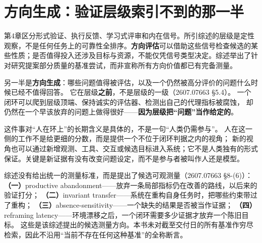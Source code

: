 \section{方向生成：验证层级索引不到的那一半}
\label{sec:ch16-direction}

\begin{sloppypar}
第4章区分形式验证、执行反馈、学习式评审和内在信号。所引综述的层级是定性观察，不是任何任务上的可靠性全排序。\textbf{方向评估}可以借助这些信号检查候选的某些性质；是否值得投入还涉及目标与资源，不能仅凭信号类型决定。综述举出了针对研究提案部分质量的基准尝试，而非宣称所有方向价值都已有完备测量。
\end{sloppypar}

\begin{sloppypar}
另一半是\textbf{方向生成}：哪些问题值得被评估，以及一个仍然被高分评价的问题什么时候已经不值得回答。
它在层级\textbf{之前}，不是层级的一级（2607.07663 §5.4）\cite{rsi-survey-2607}。
一个闭环可以爬到层级顶端、保持诚实的评估器、检测出自己的代理指标被腐蚀，
却仍然在一个早该放弃的问题上做得很好——\textbf{因为层级把“问题”当作给定的}。
\end{sloppypar}

\begin{sloppypar}
这件事对“人在环上”的长期含义是具体的，不是一句“人类仍需参与”。
人在这一侧的工作不是给更细的分数，而是提供一个不位于闭环判据之内的视角；
新的视角也可以通过新增观测、工具、交互或候选目标进入系统；它不是人类独有的形式保证。关键是新证据有没有改变问题设定，而不是参与者被叫作人还是模型。
\end{sloppypar}

\begin{sloppypar}
综述没有给出统一的测量标准，而是提出了候选可观测量（2607.07663 §8-(6)）\cite{rsi-survey-2607}：
\textbf{（一）}productive abandonment——放弃一条局部指标仍在改善的路线，以后来的验证打分；
\textbf{（二）}invariant transfer——系统在重构自身任务时，把哪些约束带过了重构；
\textbf{（三）}absence-sensitivity——一个缺失的结果是否被当作证据；
\textbf{（四）}reframing latency——环境漂移之后，一个闭环需要多少证据才放弃一个陈旧目标。
这些是该综述提出的候选测量方向。本书未对截至交付日的所有基准作穷尽检索，因此不沿用“当前不存在任何这种基准”的全称断言。
\end{sloppypar}



